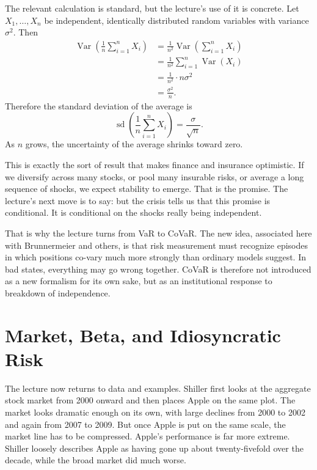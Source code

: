 The relevant calculation is standard, but the lecture's use of it is concrete. Let \(X_1,\dots,X_n\) be independent, identically distributed random variables with variance \(\sigma^2\). Then
\begin{align}
\operatorname{Var}\!\left(\frac{1}{n}\sum_{i=1}^{n}X_i\right)
&= \frac{1}{n^2}\operatorname{Var}\!\left(\sum_{i=1}^{n}X_i\right) \\
&= \frac{1}{n^2}\sum_{i=1}^{n}\operatorname{Var}(X_i) \\
&= \frac{1}{n^2}\cdot n\sigma^2 \\
&= \frac{\sigma^2}{n}.
\end{align}
Therefore the standard deviation of the average is
\begin{equation}
\operatorname{sd}\!\left(\frac{1}{n}\sum_{i=1}^{n}X_i\right)=\frac{\sigma}{\sqrt{n}}.
\end{equation}
As \(n\) grows, the uncertainty of the average shrinks toward zero.

This is exactly the sort of result that makes finance and insurance optimistic. If we diversify across many stocks, or pool many insurable risks, or average a long sequence of shocks, we expect stability to emerge. That is the promise. The lecture's next move is to say: but the crisis tells us that this promise is conditional. It is conditional on the shocks really being independent.

That is why the lecture turns from VaR to CoVaR. The new idea, associated here with Brunnermeier and others, is that risk measurement must recognize episodes in which positions co-vary much more strongly than ordinary models suggest. In bad states, everything may go wrong together. CoVaR is therefore not introduced as a new formalism for its own sake, but as an institutional response to breakdown of independence.

\section{Market, Beta, and Idiosyncratic Risk}

The lecture now returns to data and examples. Shiller first looks at the aggregate stock market from 2000 onward and then places Apple on the same plot. The market looks dramatic enough on its own, with large declines from 2000 to 2002 and again from 2007 to 2009. But once Apple is put on the same scale, the market line has to be compressed. Apple's performance is far more extreme. Shiller loosely describes Apple as having gone up about twenty-fivefold over the decade, while the broad market did much worse.

